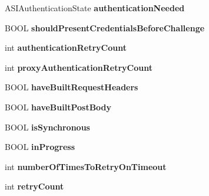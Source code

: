 \begin{DoxyCompactItemize}
\item 
\hypertarget{interface_a_s_i_h_t_t_p_request_a6b84e61d04187f5f9fab1054ed1e4b3a}{
ASIAuthenticationState {\bfseries authenticationNeeded}}
\label{interface_a_s_i_h_t_t_p_request_a6b84e61d04187f5f9fab1054ed1e4b3a}

\item 
\hypertarget{interface_a_s_i_h_t_t_p_request_a8978423b1982add33aff4c7dcd69dd11}{
BOOL {\bfseries shouldPresentCredentialsBeforeChallenge}}
\label{interface_a_s_i_h_t_t_p_request_a8978423b1982add33aff4c7dcd69dd11}

\item 
\hypertarget{interface_a_s_i_h_t_t_p_request_ab46c6643da18fc20cd709c7ec8fd982f}{
int {\bfseries authenticationRetryCount}}
\label{interface_a_s_i_h_t_t_p_request_ab46c6643da18fc20cd709c7ec8fd982f}

\item 
\hypertarget{interface_a_s_i_h_t_t_p_request_af8ba258b08d290b6c301902b2a1a4676}{
int {\bfseries proxyAuthenticationRetryCount}}
\label{interface_a_s_i_h_t_t_p_request_af8ba258b08d290b6c301902b2a1a4676}

\item 
\hypertarget{interface_a_s_i_h_t_t_p_request_a977d6c3b6f20704185b4c29fefc5b216}{
BOOL {\bfseries haveBuiltRequestHeaders}}
\label{interface_a_s_i_h_t_t_p_request_a977d6c3b6f20704185b4c29fefc5b216}

\item 
\hypertarget{interface_a_s_i_h_t_t_p_request_aa709c26bad7ac8b7ddeb6f4a67298233}{
BOOL {\bfseries haveBuiltPostBody}}
\label{interface_a_s_i_h_t_t_p_request_aa709c26bad7ac8b7ddeb6f4a67298233}

\item 
\hypertarget{interface_a_s_i_h_t_t_p_request_a65012370eb348bfe9c614b8abce149fd}{
BOOL {\bfseries isSynchronous}}
\label{interface_a_s_i_h_t_t_p_request_a65012370eb348bfe9c614b8abce149fd}

\item 
\hypertarget{interface_a_s_i_h_t_t_p_request_a237c868d6b2169457731583115bf4fbe}{
BOOL {\bfseries inProgress}}
\label{interface_a_s_i_h_t_t_p_request_a237c868d6b2169457731583115bf4fbe}

\item 
\hypertarget{interface_a_s_i_h_t_t_p_request_a8eea10735a5448ef050bcb0abf1a8653}{
int {\bfseries numberOfTimesToRetryOnTimeout}}
\label{interface_a_s_i_h_t_t_p_request_a8eea10735a5448ef050bcb0abf1a8653}

\item 
\hypertarget{interface_a_s_i_h_t_t_p_request_aaeea2f6419edbd89a890629d83fffadb}{
int {\bfseries retryCount}}
\label{interface_a_s_i_h_t_t_p_request_aaeea2f6419edbd89a890629d83fffadb}


\end{DoxyCompactItemize}
